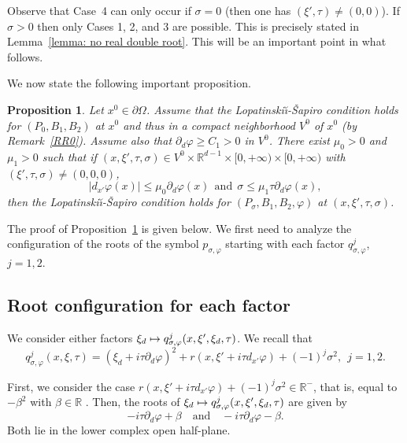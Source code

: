 \documentclass[JEP,XML,SOM,Unicode,published]{cedram}
\newcommand{\quand}{\quad\text{and}\quad}
\newcommand\mto{\mathchoice{\longmapsto}{\mapsto}{\mapsto}{\mapsto}}
\theoremstyle{plain}
\newtheorem{proposition}[theorem]{Proposition}
\theoremstyle{definition}
\def\R{\mathbb{R}}
\newcommand{\LS}{Lopatinski\u{\i}-\v{S}apiro\xspace}
\newcommand{\Psig}{P_{\sigma}}
\newcommand{\pconj}{p_{\sigma,\varphi}}
\newcommand{\qconj}{q_{\sigma,\varphi}}
\begin{document}
Observe that Case~4 can only occur if $\sigma =0$ (then one has
$(\xi',\tau) \neq (0,0)$). If $\sigma > 0$ then only Cases 1, 2, and 3
are possible. This is precisely stated in Lemma~\ref{lemma: no real
double root}. This will be an important point in what follows.

We now state the following important proposition.

\begin{proposition}
\label{prop: LS after conjugation}
Let $x^0\in\partial\Omega$. Assume that the \LS condition holds for
$(P_0, B_1, B_2)$ at $x^0$ and thus in a compact neighborhood $V^0$
of $x^0$ (by Remark~\ref{RR0}). Assume also that
$\partial_d\varphi\geq C_1> 0$ in $V^0$. There exist $\mu_0>0$ and
$\mu_1>0$ such that if
$(x,\xi',\tau,\sigma)\in V^0\times\R^{d-1}\times[0,+\infty) \times[0,+\infty) $ with
$(\xi',\tau,\sigma)\neq (0, 0,0)$,
\begin{equation*}
|d_{x'}\varphi(x)|\leq \mu_0\partial_d\varphi(x)
\ \ \text{and} \ \
\sigma \leq \mu_1\tau \partial_d\varphi(x),
\end{equation*}
then the \LS condition holds for $(\Psig , B_1, B_2, \varphi)$ at
$(x,\xi',\tau,\sigma)$.
\end{proposition}

The proof of Proposition~\ref{prop: LS after conjugation} is given below. We first need to
analyze the configuration of the roots of the symbol
$\pconj$ starting with each factor $\qconj^j$, $j=1,2$.

\subsection{Root configuration for each factor}
\label{sec: Root configuration for each factor}
We consider either factors $\xi_d\mto
\qconj^j(x,\xi',\xi_d,\tau)$. We recall that
\begin{equation*}
\qconj^j(x,\xi,\tau)
=(\xi_d+i\tau\partial_d\varphi)^2
+r(x,\xi'+i\tau d_{x'}\varphi) + (-1)^j \sigma^2,
\ \ j=1,2.
\end{equation*}

First, we consider the case $r(x,\xi'+i\tau
d_{x'}\varphi) + (-1)^j \sigma^2 \in \R^-$, that is, equal to $-
\beta^2$ with $\beta\in \R$ .
Then, the roots of $\xi_d\mto
\qconj^j(x,\xi',\xi_d,\tau)$ are given by
\begin{equation*}
-i\tau\partial_d\varphi + \beta
\quand
-i\tau\partial_d\varphi - \beta.
\end{equation*}
Both lie in the lower complex open half-plane.
\end{document}

